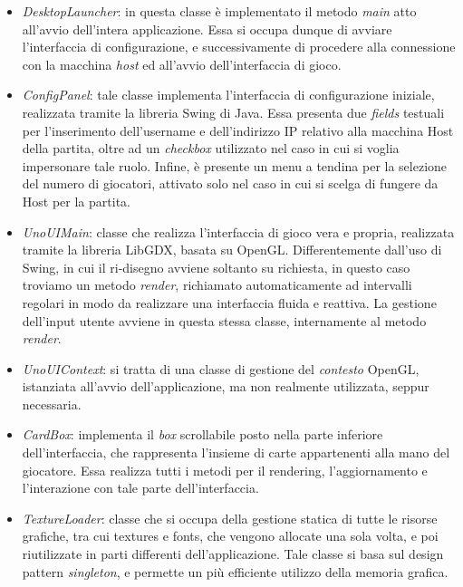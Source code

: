 \documentclass[11pt]{article} %
\begin{document}
\begin{itemize}
	\item \emph{DesktopLauncher}: in questa classe è implementato il metodo \textit{main} atto all'avvio dell'intera applicazione. Essa si occupa dunque di avviare l'interfaccia di configurazione, e successivamente di procedere alla connessione con la macchina \textit{host} ed all'avvio dell'interfaccia di gioco.
	\item \emph{ConfigPanel}: tale classe implementa l'interfaccia di configurazione iniziale, realizzata tramite la libreria Swing di Java. Essa presenta due \textit{fields} testuali per l'inserimento dell'username e dell'indirizzo IP relativo alla macchina Host della partita, oltre ad un \textit{checkbox} utilizzato nel caso in cui si voglia impersonare tale ruolo. Infine, è presente un menu a tendina per la selezione del numero di giocatori, attivato solo nel caso in cui si scelga di fungere da Host per la partita.
	\item \emph{UnoUIMain}: classe che realizza l'interfaccia di gioco vera e propria, realizzata tramite la libreria LibGDX, basata su OpenGL. Differentemente dall'uso di Swing, in cui il ri-disegno avviene soltanto su richiesta, in questo caso troviamo un metodo \textit{render}, richiamato automaticamente ad intervalli regolari in modo da realizzare una interfaccia fluida e reattiva. La gestione dell'input utente avviene in questa stessa classe, internamente al metodo \textit{render}.
	\item \emph{UnoUIContext}: si tratta di una classe di gestione del \textit{contesto} OpenGL, istanziata all'avvio dell'applicazione, ma non realmente utilizzata, seppur necessaria.
	\item \emph{CardBox}: implementa il \textit{box} scrollabile posto nella parte inferiore dell'interfaccia, che rappresenta l'insieme di carte appartenenti alla mano del giocatore. Essa realizza tutti i metodi per il rendering, l'aggiornamento e l'interazione con tale parte dell'interfaccia.
	\item \emph{TextureLoader}: classe che si occupa della gestione statica di tutte le risorse grafiche, tra cui textures e fonts, che vengono allocate una sola volta, e poi riutilizzate in parti differenti dell'applicazione. Tale classe si basa sul design pattern \textit{singleton}, e permette un più efficiente utilizzo della memoria grafica. 
\end{itemize}

\vspace{3mm}
\end{document}
